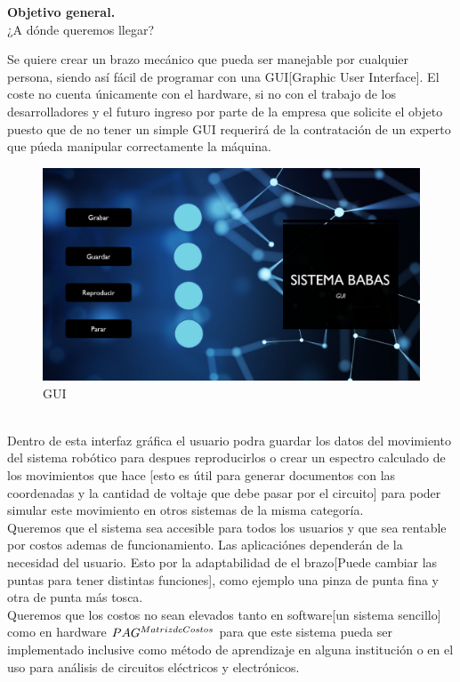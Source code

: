 \documentclass[letterpaper]{article}
\begin{document}
\begin{large}
    \begin{LARGE}
        \textbf{Objetivo general.}\\
       
       
        ¿A dónde queremos llegar?\\
     
         
    \end{LARGE}
        Se quiere crear un brazo mecánico que pueda ser manejable por cualquier persona, siendo así fácil de programar con una GUI[Graphic User Interface]. El coste no cuenta únicamente con el hardware, si no con el trabajo de los desarrolladores y el futuro ingreso por parte de la empresa que solicite el objeto puesto que de no tener un simple GUI requerirá de la contratación de un experto que púeda manipular correctamente la máquina.\\
 \vspace{.6cm}
        \begin{figure}[htbp]
            \centering
            \includegraphics[scale=0.2]{Img/babas.jpeg}
            \caption{GUI}
            \label{fig:gui}
        \end{figure}\\
    Dentro de esta interfaz gráfica el usuario podra guardar los datos del movimiento del sistema robótico para despues reproducirlos o crear un espectro calculado de los movimientos que hace [esto es útil para generar documentos con las coordenadas y la cantidad de voltaje que debe pasar por el circuito] para poder simular este movimiento en otros sistemas de la misma categoría. \\
    Queremos que el sistema sea accesible para todos los usuarios y que sea rentable por costos ademas de funcionamiento. Las aplicaciónes dependerán de la necesidad del usuario. Esto por la adaptabilidad de el brazo[Puede cambiar las puntas para tener distintas funciones], como ejemplo una pinza de punta fina y otra de punta más tosca.\\
    Queremos que los costos no sean elevados tanto en software[un sistema sencillo] como en hardware $\begin{LARGE}PAG\end{LARGE}^{ Matriz de Costos}$ para que este sistema pueda ser implementado inclusive como método de aprendizaje en alguna institución o en el uso para análisis de circuitos eléctricos y electrónicos.
        
\end{large}
\end{document}
